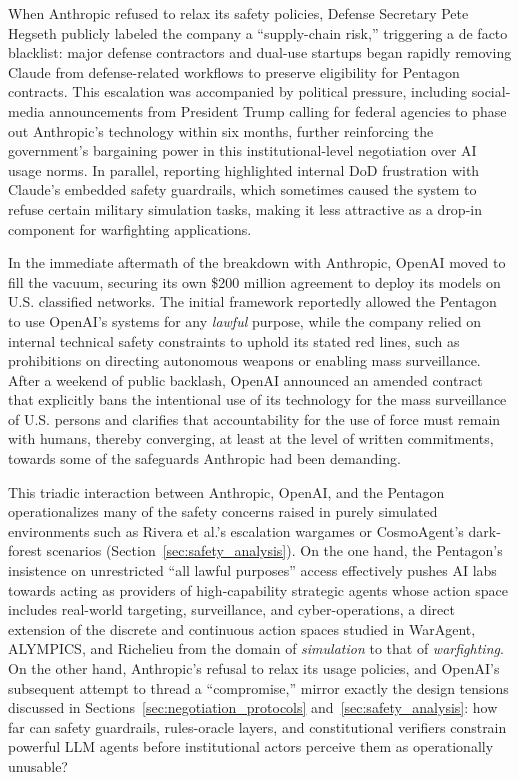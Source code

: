 When Anthropic refused to relax its safety policies, Defense Secretary Pete Hegseth publicly labeled the company a ``supply-chain risk,'' triggering a de facto blacklist: major defense contractors and dual-use startups began rapidly removing Claude from defense-related workflows to preserve eligibility for Pentagon contracts.\cite{reutersAnthropicWalksAway} This escalation was accompanied by political pressure, including social-media announcements from President Trump calling for federal agencies to phase out Anthropic's technology within six months, further reinforcing the government's bargaining power in this institutional-level negotiation over AI usage norms.\cite{cnbcAnthropicBlacklist} In parallel, reporting highlighted internal DoD frustration with Claude's embedded safety guardrails, which sometimes caused the system to refuse certain military simulation tasks, making it less attractive as a drop-in component for warfighting applications.\cite{reutersAnthropicWalksAway}

In the immediate aftermath of the breakdown with Anthropic, OpenAI moved to fill the vacuum, securing its own \$200 million agreement to deploy its models on U.S. classified networks.\cite{guardianOpenAIMilitaryContract} The initial framework reportedly allowed the Pentagon to use OpenAI's systems for any \textit{lawful} purpose, while the company relied on internal technical safety constraints to uphold its stated red lines, such as prohibitions on directing autonomous weapons or enabling mass surveillance.\cite{nytOpenAIAmendsDeal} After a weekend of public backlash, OpenAI announced an amended contract that explicitly bans the intentional use of its technology for the mass surveillance of U.S. persons and clarifies that accountability for the use of force must remain with humans, thereby converging, at least at the level of written commitments, towards some of the safeguards Anthropic had been demanding.\cite{nytOpenAIAmendsDeal}

This triadic interaction between Anthropic, OpenAI, and the Pentagon operationalizes many of the safety concerns raised in purely simulated environments such as Rivera et al.'s escalation wargames or CosmoAgent's dark-forest scenarios (Section~\ref{sec:safety_analysis}). On the one hand, the Pentagon's insistence on unrestricted ``all lawful purposes'' access effectively pushes AI labs towards acting as providers of high-capability strategic agents whose action space includes real-world targeting, surveillance, and cyber-operations, a direct extension of the discrete and continuous action spaces studied in WarAgent, ALYMPICS, and Richelieu from the domain of \textit{simulation} to that of \textit{warfighting}.\cite{rivera2024escalation, mao2023alympics, guan2024richelieu} On the other hand, Anthropic's refusal to relax its usage policies, and OpenAI's subsequent attempt to thread a ``compromise,'' mirror exactly the design tensions discussed in Sections~\ref{sec:negotiation_protocols} and~\ref{sec:safety_analysis}: how far can safety guardrails, rules-oracle layers, and constitutional verifiers constrain powerful LLM agents before institutional actors perceive them as operationally unusable?

